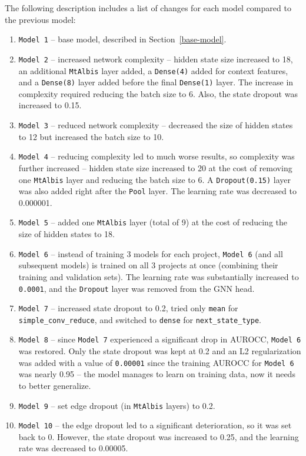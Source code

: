 The following description includes a list of changes for each model compared to the previous model:
\begin{enumerate}
    \item \texttt{Model 1} -- base model, described in Section~\ref{base-model}.
    \item \texttt{Model 2} -- increased network complexity -- hidden state size increased to 18, an additional \texttt{MtAlbis} layer added, a \texttt{Dense(4)} added for context features, and a \texttt{Dense(8)} layer added before the final \texttt{Dense(1)} layer. The increase in complexity required reducing the batch size to 6. Also, the state dropout was increased to 0.15.
    \item \texttt{Model 3} -- reduced network complexity -- decreased the size of hidden states to 12 but increased the batch size to 10.
    \item \texttt{Model 4} -- reducing complexity led to much worse results, so complexity was further increased -- hidden state size increased to 20 at the cost of removing one \texttt{MtAlbis} layer and reducing the batch size to 6. A \texttt{Dropout(0.15)} layer was also added right after the \texttt{Pool} layer. The learning rate was decreased to 0.000001.
    \item \texttt{Model 5} -- added one \texttt{MtAlbis} layer (total of 9) at the cost of reducing the size of hidden states to 18.
    \item \texttt{Model 6} -- instead of training 3 models for each project, \texttt{Model 6} (and all subsequent models) is trained on all 3 projects at once (combining their training and validation sets). The learning rate was substantially increased to \texttt{0.0001}, and the \texttt{Dropout} layer was removed from the GNN head.
    \item \texttt{Model 7} -- increased state dropout to 0.2, tried only \texttt{mean} for \texttt{simple\_conv\_reduce}, and switched to \texttt{dense} for \texttt{next\_state\_type}.
    \item \texttt{Model 8} -- since \texttt{Model 7} experienced a significant drop in AUROCC, \texttt{Model 6} was restored. Only the state dropout was kept at 0.2 and an L2 regularization was added with a value of \texttt{0.00001} since the training AUROCC for \texttt{Model 6} was nearly 0.95 -- the model manages to learn on training data, now it needs to better generalize.
    \item \texttt{Model 9} -- set edge dropout (in \texttt{MtAlbis} layers) to 0.2.
    \item \texttt{Model 10} -- the edge dropout led to a significant deterioration, so it was set back to 0. However, the state dropout was increased to 0.25, and the learning rate was decreased to 0.00005.

\end{enumerate}
